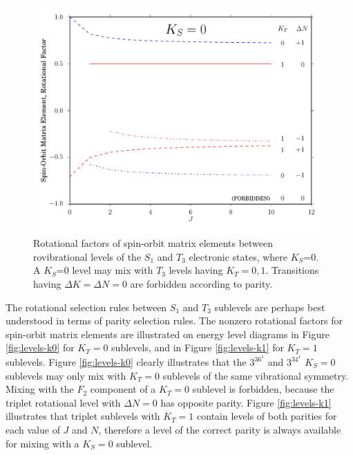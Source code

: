 \documentclass[12pt]{mitthesis}
\begin{document}

\begin{figure}
  \caption{Rotational factors of spin-orbit matrix elements between
    rovibrational levels of the $S_1$ and $T_3$ electronic states,
    where $K_S$=0.  A $K_S$=0 level may mix with $T_3$ levels having
    $K_T=0,1$.  Transitions having $\Delta K = \Delta N = 0$ are
    forbidden according to parity.}
  \label{fig:rotational-factors}
  \centering
  \includegraphics[width=6in]{rotational-factors-k0.pdf}
\end{figure}


The rotational selection rules between $S_1$ and $T_3$ sublevels are
perhaps best understood in terms of parity selection rules.  The
nonzero rotational factors for spin-orbit matrix elements are
illustrated on energy level diagrams in Figure \ref{fig:levels-k0} for
$K_T=0$ sublevels, and in Figure \ref{fig:levels-k1} for $K_T=1$
sublevels.  Figure \ref{fig:levels-k0} clearly illustrates that the
$3^36^1$ and $3^34^1$ $K_S=0$ sublevels may only mix with $K_T=0$
sublevels of the same vibrational symmetry.  Mixing with the $F_2$
component of a $K_T=0$ sublevel is forbidden, because the triplet
rotational level with $\Delta N=0$ has opposite parity.  Figure
\ref{fig:levels-k1} illustrates that triplet sublevels with $K_T=1$
contain levels of both parities for each value of $J$ and $N$,
therefore a level of the correct parity is always available for mixing
with a $K_S=0$ sublevel.
\end{document}
